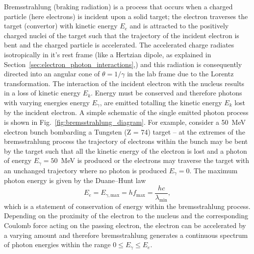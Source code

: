 \documentclass[../main.tex]{subfiles}
\begin{document}
Bremsstrahlung (braking radiation) is a process that occurs when a charged particle (here electrons) is incident upon a solid target; the electron traverses the target (convertor) with kinetic energy $E_{e}$ and is attracted to the positively charged nuclei of the target such that the trajectory of the incident electron is bent and the charged particle is accelerated. The accelerated charge radiates  isotropically in it's rest frame (like a Hertzian dipole, as explained in Section~\ref{sec:electron_photon_interactions},) and this radiation is consequently directed into an angular cone of $\theta=1/\gamma$ in the lab frame due to the Lorentz transformation. The interaction of the incident electron with the nucleus results in a loss of kinetic energy $E_{k}$. Energy must be conserved and therefore photons with varying energies energy $E_{\gamma}$, are emitted totalling the kinetic energy $E_{k}$ lost by the incident electron. A simple schematic of the single emitted photon process is shown in Fig.~\ref{fig:bremsstrahlung_diagram}. For example, consider a 50~\si{\mega\electronvolt} electron bunch bombarding a Tungsten (Z = 74) target -- at the extremes of the bremsstrahlung process the trajectory of electrons within the bunch may be bent by the target such that all the kinetic energy of the electron is lost and a photon of energy $E_{\gamma}=50$~\si{\mega\electronvolt} is produced or the electrons may traverse the target with an unchanged trajectory where no photon is produced $E_{\gamma}=0$. The maximum photon energy is given by the Duane--Hunt law \cite{duane1915xray}
\begin{equation}
E_{e} = E_{\gamma,\mathrm{max}} = hf_{\mathrm{max}} = \frac{hc}{\lambda_{\mathrm{min}}},
\label{eq:Duane_Hunt_law}    
\end{equation}
which is a statement of conservation of energy within the bremsstrahlung process. Depending on the proximity of the electron to the nucleus and the corresponding Coulomb force acting on the passing electron, the electron can be accelerated by a varying amount and therefore bremsstrahlung generates a continuous spectrum of photon energies within the range $0 \leq E_{\gamma} \leq E_{e}$.
\end{document}
